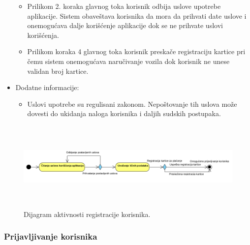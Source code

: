 \begin{itemize}
        \begin{itemize}
            \item Prilikom 2. koraka glavnog toka korisnik odbija uslove upotrebe aplikacije. Sistem obaveštava korisnika da mora da prihvati date uslove i onemogućava dalje korišćenje aplikacije dok se ne prihvate uslovi korišćenja.
            \item Prilikom koraka 4 glavnog toka korisnik preskače registraciju kartice pri čemu sistem onemogućava naručivanje vozila dok korisnik ne unese validan broj kartice.
        \end{itemize}
    \item Dodatne informacije:
        \begin{itemize}
            \item Uslovi upotrebe su regulisani zakonom. Nepoštovanje tih uslova može dovesti do ukidanja naloga korisnika i daljih sudskih postupaka.
        \end{itemize}
\end{itemize}

\begin{figure}[H]
\begin{center}
\includegraphics[width=\textwidth, height=125pt]{Slike/RegistracijaKorisnika.png}
\end{center}
    \caption{Dijagram aktivnosti registracije korisnika.}
\label{fig:RegistracijaKorisnika}
\end{figure}

\subsubsection{\bfseries Prijavljivanje korisnika}

